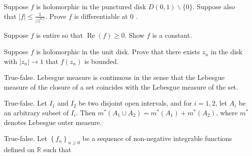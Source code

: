 \documentclass[14pt]{extarticle}
\begin{document}
Suppose $f$ is holomorphic in the punctured disk $D(0,1) \backslash\{0\}$. Suppose also that $|f| \leq \frac{1}{|z|^{0.5}}$. Prove $f$ is differentiable at 0 .
\newpage

Suppose $f$ is entire so that $\operatorname{Re}(f) \geq 0$. Show $f$ is a constant.
\newpage

Suppose $f$ is holomorphic in the unit disk. Prove that there exists $z_{n}$ in the disk with $\left|z_{n}\right| \rightarrow 1$ that $f\left(z_{n}\right)$ is bounded.
\newpage

True-false. Lebesgue measure is continuous in the sense that the Lebesgue measure of the closure of a set coincides with the Lebesgue measure of the set.
\newpage

True-false. Let $I_{1}$ and $I_{2}$ be two disjoint open intervals, and for $i=1,2$, let $A_{i}$ be an arbitrary subset of $I_{i}$. Then $m^{*}\left(A_{1} \cup A_{2}\right)=m^{*}\left(A_{1}\right)+m^{*}\left(A_{2}\right)$, where $m^{*}$ denotes Lebesgue outer measure.
\newpage

True-false. Let $\left\{f_{n}\right\}_{n \geq 0}$ be a sequence of non-negative integrable functions defined on $\mathbb{R}$ such that
\end{document}
